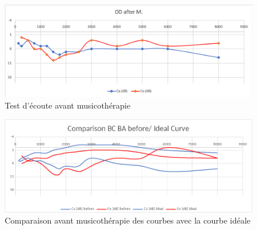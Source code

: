 \begin{figure}[tbh]
	\centering
	\includegraphics[width=1\linewidth]{images/clinique/od_before_m.png}
	\caption{Test d'écoute avant musicothérapie}
	\label{fig:odbeforemeyer}
\end{figure}
	\begin{figure}
	\centering
	\includegraphics[width=1\linewidth]{images/clinique/comparison_bc_ba_before_vs_ideal_curve_meyer.png}
	\caption[Comparaison avec la courbe idéale]{Comparaison avant
		musicothérapie des
		courbes  avec la courbe idéale}
	\label{fig:comparisonbcbabeforevsidealcurvemeyer}
\end{figure}



